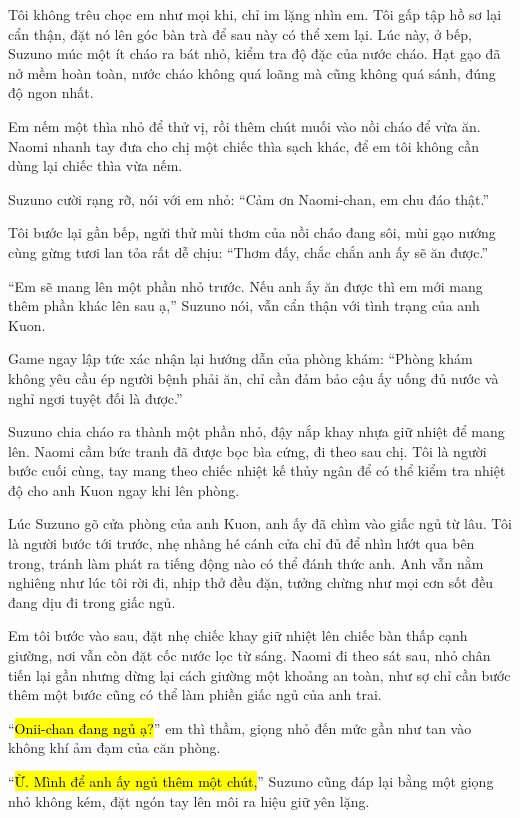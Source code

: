 \documentclass[../main.tex]{subfiles}
\begin{document}
Tôi không trêu chọc em như mọi khi, chỉ im lặng nhìn em. Tôi gấp tập hồ sơ lại cẩn thận, đặt nó lên góc bàn trà để sau này có thể xem lại. Lúc này, ở bếp, Suzuno múc một ít cháo ra bát nhỏ, kiểm tra độ đặc của nước cháo. Hạt gạo đã nở mềm hoàn toàn, nước cháo không quá loãng mà cũng không quá sánh, đúng độ ngon nhất.

Em nếm một thìa nhỏ để thử vị, rồi thêm chút muối vào nồi cháo để vừa ăn. Naomi nhanh tay đưa cho chị một chiếc thìa sạch khác, để em tôi không cần dùng lại chiếc thìa vừa nếm. 

Suzuno cười rạng rỡ, nói với em nhỏ: ``Cảm ơn Naomi-chan, em chu đáo thật.''

Tôi bước lại gần bếp, ngửi thử mùi thơm của nồi cháo đang sôi, mùi gạo nướng cùng gừng tươi lan tỏa rất dễ chịu: ``Thơm đấy, chắc chắn anh ấy sẽ ăn được.''

``Em sẽ mang lên một phần nhỏ trước. Nếu anh ấy ăn được thì em mới mang thêm phần khác lên sau ạ,'' Suzuno nói, vẫn cẩn thận với tình trạng của anh Kuon.

Game ngay lập tức xác nhận lại hướng dẫn của phòng khám: ``Phòng khám không yêu cầu ép người bệnh phải ăn, chỉ cần đảm bảo cậu ấy uống đủ nước và nghỉ ngơi tuyệt đối là được.''

Suzuno chia cháo ra thành một phần nhỏ, đậy nắp khay nhựa giữ nhiệt để mang lên. Naomi cầm bức tranh đã được bọc bìa cứng, đi theo sau chị. Tôi là người bước cuối cùng, tay mang theo chiếc nhiệt kế thủy ngân để có thể kiểm tra nhiệt độ cho anh Kuon ngay khi lên phòng.

\ct

Lúc Suzuno gõ cửa phòng của anh Kuon, anh ấy đã chìm vào giấc ngủ từ lâu. Tôi là người bước tới trước, nhẹ nhàng hé cánh cửa chỉ đủ để nhìn lướt qua bên trong, tránh làm phát ra tiếng động nào có thể đánh thức anh. Anh vẫn nằm nghiêng như lúc tôi rời đi, nhịp thở đều đặn, tưởng chừng như mọi cơn sốt đều đang dịu đi trong giấc ngủ.

Em tôi bước vào sau, đặt nhẹ chiếc khay giữ nhiệt lên chiếc bàn thấp cạnh giường, nơi vẫn còn đặt cốc nước lọc từ sáng. Naomi đi theo sát sau, nhỏ chân tiến lại gần nhưng dừng lại cách giường một khoảng an toàn, như sợ chỉ cần bước thêm một bước cũng có thể làm phiền giấc ngủ của anh trai.

``\hl{Onii-chan đang ngủ ạ?}'' em thì thầm, giọng nhỏ đến mức gần như tan vào không khí ảm đạm của căn phòng.

``\hl{Ừ. Mình để anh ấy ngủ thêm một chút,}'' Suzuno cũng đáp lại bằng một giọng nhỏ không kém, đặt ngón tay lên môi ra hiệu giữ yên lặng.
\end{document}
